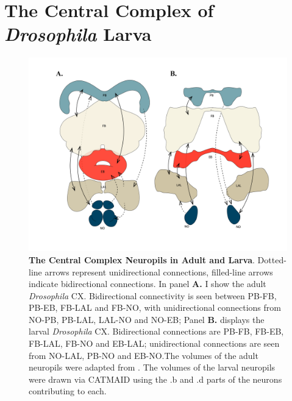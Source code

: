 \section{The Central Complex of \textit{Drosophila} Larva}
\label{CXLarva}

    \begin{figure}[H]
        \centering
        \includegraphics[width=12cm]{Figs/CX/cxdiagram.pdf}
        \caption[The Central Complex Neuropils in Adult and Larva]{\textbf{The Central Complex Neuropils in Adult and Larva}. Dotted-line arrows represent unidirectional connections, filled-line arrows indicate bidirectional connections. In panel \textbf{A.} I show the adult \textit{\textit{Drosophila}} CX. Bidirectional connectivity is seen between PB-FB, PB-EB, FB-LAL and FB-NO, with unidirectional connections from NO-PB, PB-LAL, LAL-NO and NO-EB; Panel \textbf{B.} displays the larval \textit{Drosophila} CX. Bidirectional connections are  PB-FB, FB-EB, FB-LAL, FB-NO and EB-LAL; unidirectional connections are seen from NO-LAL, PB-NO and EB-NO.The volumes of the adult neuropils were adapted from \citep{franconville2018building}.
        The volumes of the larval neuropils were drawn via CATMAID using the .b and .d parts of the neurons contributing to each.}
        \label{cxdiagram}
    \end{figure}


    

